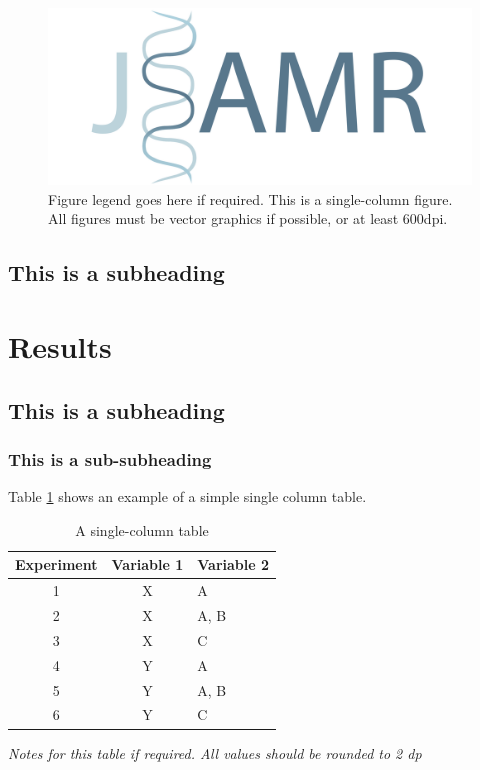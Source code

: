 \documentclass[paper=a4,fontsize=11pt,twocolumn]{article}
\begin{document}
\begin{figure}
\centering
\includegraphics[width=\columnwidth]{logo-wide-jsamr.pdf}
\caption{Figure legend goes here if required. This is a single-column figure. All figures must be vector graphics if possible, or at least 600dpi.}
\label{fig:one-column}
\end{figure}

\lipsum[8-9]

\subsection{This is a subheading}
\lipsum[10-11]
\cite {Burns1981}

\section{Results}
\subsection{This is a subheading}
\subsubsection{This is a sub-subheading}

Table \ref{tab:one-column} shows an example of a simple single column table.

\begin{table}
\begin{centering}
\caption{A single-column table}\label{tab:one-column}
	\begin{tabular}[\columnwidth]{ccl}\toprule
		Experiment &  Variable 1 &  Variable 2 \\
		\midrule
		1  & X & A \\
		2  & X & A, B \\
		3  & X & C \\
		4  & Y & A \\
		5  & Y & A, B \\
		6  & Y & C \\
		\bottomrule
	\end{tabular}\par
	\medskip
\textit{Notes for this table if required. All values should be rounded to 2 dp}
\end{centering}
\end{table}
\end{document}
